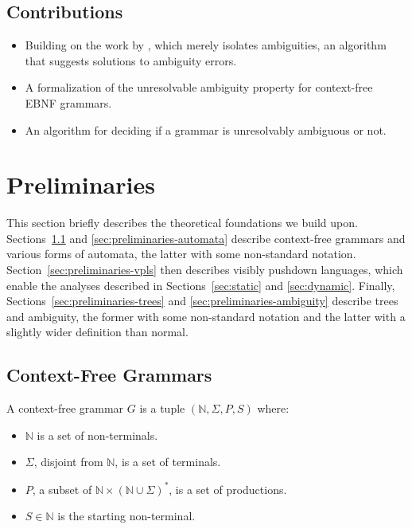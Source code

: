 \documentclass[acmsmall,review,anonymous]{acmart}\settopmatter{printfolios=true,printccs=false,printacmref=false}
\newcommand{\NT}{\mathbb{N}} %
\newcommand{\T}{\Sigma} %
\begin{document}
\subsection{Contributions}

\begin{itemize}
  \item Building on the work by \citet{palmkvistCreatingDomainSpecificLanguages2019}, which merely isolates ambiguities, an algorithm that suggests solutions to ambiguity errors.
  \item A formalization of the unresolvable ambiguity property for context-free EBNF grammars.
  \item An algorithm for deciding if a grammar is unresolvably ambiguous or not.
\end{itemize}

\section{Preliminaries}

This section briefly describes the theoretical foundations we build upon. Sections~\ref{sec:preliminaries-cfgs} and \ref{sec:preliminaries-automata} describe context-free grammars and various forms of automata, the latter with some non-standard notation. Section~\ref{sec:preliminaries-vpls} then describes visibly pushdown languages, which enable the analyses described in Sections~\ref{sec:static} and \ref{sec:dynamic}. Finally, Sections~\ref{sec:preliminaries-trees} and \ref{sec:preliminaries-ambiguity} describe trees and ambiguity, the former with some non-standard notation and the latter with a slightly wider definition than normal.

\subsection{Context-Free Grammars} \label{sec:preliminaries-cfgs}

A context-free grammar $G$ is a tuple $(\NT, \T, P, S)$ where:

\begin{itemize}
\item $\NT$ is a set of non-terminals.
\item $\T$, disjoint from $\NT$, is a set of terminals.
\item $P$, a subset of $\NT \times (\NT \cup \T)^{*}$, is a set of productions.
\item $S \in \NT$ is the starting non-terminal.
\end{itemize}
\end{document}
